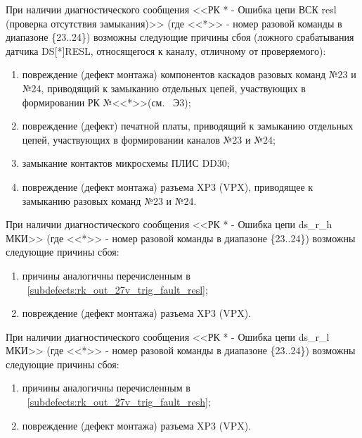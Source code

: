\begin{sloppypar}
    \subpoint При наличии диагностического сообщения <<РК * - Ошибка цепи ВСК resl (проверка отсутствия замыкания)>> 
	      (где <<*>> - номер разовой команды в диапазоне \{23..24\}) возможны следующие причины сбоя (ложного срабатывания датчика DS[*]RESL, относящегося к каналу, отличному от проверяемого):
	  \label{subdefects:rk_out_27v_trig_fault_resl_cross}
	  \begin{enumerate}	     
	    \item повреждение (дефект монтажа) компонентов каскадов разовых команд №23 и №24, 
		  приводящий к замыканию отдельных цепей, участвующих в формировании РК №<<*>>(см. \DocProductSignature~Э3);
	    \item повреждение (дефект) печатной платы, приводящий к замыканию отдельных цепей, участвующих в формировании каналов №23 и №24;
	    \item замыкание контактов микросхемы ПЛИС DD30;
	    \item повреждение (дефект монтажа) разъема XP3 (VPX), приводящее к замыканию разовых команд №23 и №24.
	  \end{enumerate}
	  
    \subpoint При наличии диагностического сообщения <<РК * - Ошибка цепи ds\_r\_h МКИ>> 
	      (где <<*>> - номер разовой команды в диапазоне \{23..24\}) возможны следующие причины сбоя:    
	  \begin{enumerate}
	    \item причины аналогичны перечисленным в ~\ref{subdefects:rk_out_27v_trig_fault_resl};%
	    \item повреждение (дефект монтажа) разъема XP3 (VPX).
	  \end{enumerate}
    
    \subpoint При наличии диагностического сообщения <<РК * - Ошибка цепи ds\_r\_l МКИ>> 
	      (где <<*>> - номер разовой команды в диапазоне \{23..24\}) возможны следующие причины сбоя:
	  \begin{enumerate}
	    \item причины аналогичны перечисленным в ~\ref{subdefects:rk_out_27v_trig_fault_resh};%
	    \item повреждение (дефект монтажа) разъема XP3 (VPX).
	  \end{enumerate}

%
  
  \end{sloppypar}
      
